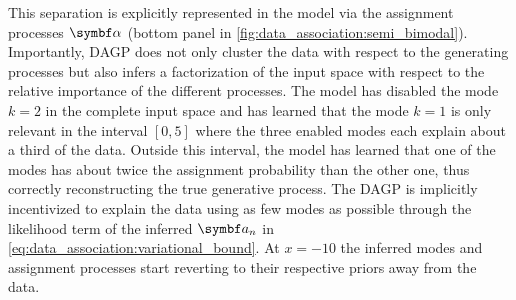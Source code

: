 This separation is explicitly represented in the model via the assignment processes $\mat{\alpha}$ (bottom panel in \cref{fig:data_association:semi_bimodal}).
Importantly, DAGP does not only cluster the data with respect to the generating processes but also infers a factorization of the input space with respect to the relative importance of the different processes.
The model has disabled the mode $k = 2$ in the complete input space and has learned that the mode $k = 1$ is only relevant in the interval $[0, 5]$ where the three enabled modes each explain about a third of the data.
Outside this interval, the model has learned that one of the modes has about twice the assignment probability than the other one, thus correctly reconstructing the true generative process.
The DAGP is implicitly incentivized to explain the data using as few modes as possible through the likelihood term of the inferred $\mat{a_n}$ in \cref{eq:data_association:variational_bound}.
At $x = -10$ the inferred modes and assignment processes start reverting to their respective priors away from the data.


